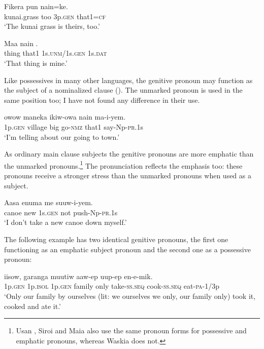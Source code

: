 \ea%
\label{ex:3:x577}
\gll Fikera pun  nain=ke. \\
kunai.grass too 3p.\textsc{gen} that1=\textsc{cf}\\
\glt`The kunai grass is theirs, too.'
\z

\ea%
\label{ex:3:x578}
\gll Maa nain  . \\
thing that1 1s.\textsc{unm}/1s.\textsc{gen} 1s.\textsc{dat}\\
\glt`That thing is mine.'
\z

Like possessives in many other languages, the genitive pronoun may function as the subject of a nominalized clause (). The unmarked pronoun is used in the same position too; I have not found any difference in their use.

\ea%
\label{ex:3:x571}
\gll {} owow maneka ikiw-owa nain ma-i-yem. \\
1p.\textsc{gen} village big go-\textsc{nmz} that1 say-Np-\textsc{pr}.1s\\
\glt`I'm telling about our going to town.'
\z

As ordinary main clause subjects the genitive pronouns are more emphatic than the unmarked pronouns.\footnote{Usan \citep[55]{Reesink1987}, Siroi \citep[20]{Wells1979} and Maia \citep[73]{Hardin2002} also use the same pronoun forms for possessive and emphatic pronouns, whereas Waskia \citep{RossEtAl1978} does not.} The pronunciation reflects the emphasis too: these pronouns receive a stronger stress than the unmarked pronouns when used as a subject.

\ea%
\label{ex:3:x572}
\gll Aasa enuma  me suuw-i-yem. \\
canoe new 1s.\textsc{gen} not push-Np-\textsc{pr}.1s\\
\glt`I don't take a new canoe down myself.'
\z

The following example has two identical genitive pronouns, the first one functioning as an emphatic subject pronoun and the second one as a possessive pronoun:

\ea%
\label{ex:3:x686}
\gll {} iisow,  garanga muutiw aaw-ep uup-ep en-e-mik.\\
1p.\textsc{gen} 1p.\textsc{isol} 1p.\textsc{gen} family only take-\textsc{ss}.\textsc{seq} cook-\textsc{ss}.\textsc{seq} eat-\textsc{pa}-1/3p\\
\glt`Only our family by ourselves (lit: we ourselves we only, our family only) took it, cooked and ate it.'
\z

